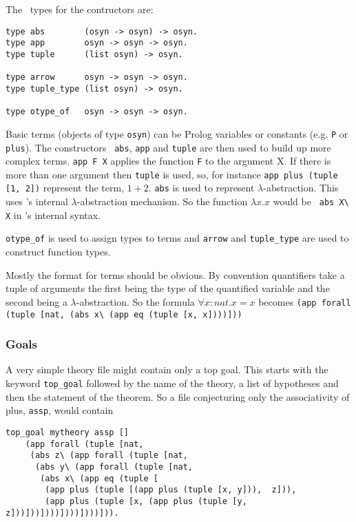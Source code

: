 The \lprolog\ types for the contructors are:
\begin{verbatim}
type abs        (osyn -> osyn) -> osyn.
type app        osyn -> osyn -> osyn.
type tuple      (list osyn) -> osyn.

type arrow      osyn -> osyn -> osyn.
type tuple_type (list osyn) -> osyn.

type otype_of   osyn -> osyn -> osyn.
\end{verbatim}
Basic
terms (objects of type {\tt osyn}) can be Prolog variables 
or constants (e.g. {\tt P} or {\tt plus}).  The constructors {\tt
  abs}, {\tt app} and {\tt tuple}
are then used to build up more complex terms.  {\tt app F X}
applies
the function {\tt F} to the argument {X}.  If there is more than one
argument then {\tt tuple} is used, so, for instance 
{\tt app plus (tuple [1, 2])} represent the term, $1 + 2$.  {\tt abs}
is used to represent
$\lambda$-abstraction.  This uses
\lprolog's internal $\lambda$-abstraction mechanism.  So the function
$\lambda x. x$ would be {\verb+ abs X\ X+} in \lclam's internal
syntax.

{\tt otype\_of} is used to assign types to terms and
{\tt arrow} and {\tt tuple\_type} are
used to construct function types.


Mostly the format for terms should be obvious.  By convention
quantifiers take a tuple of arguments the first
being the type of the 
quantified variable and the second being a $\lambda$-abstraction.  So
the formula $\forall x:nat.  x = x$ becomes \linebreak
\verb+(app forall (tuple [nat, (abs x\ (app eq (tuple [x, x])))]))+

\subsubsection{Goals}
A very simple theory file might contain only a top
goal.
This starts with the keyword {\tt top\_goal} followed
by the name of the theory, a list of hypotheses
and then the statement of the theorem.  So a file
conjecturing only the associativity of plus,
{\tt assp}, would contain

\begin{verbatim}
top_goal mytheory assp []
    (app forall (tuple [nat, 
     (abs z\ (app forall (tuple [nat, 
      (abs y\ (app forall (tuple [nat, 
       (abs x\ (app eq (tuple [
        (app plus (tuple [(app plus (tuple [x, y])),  z])), 
        (app plus (tuple [x, (app plus (tuple [y, z]))]))])))])))])))])).
\end{verbatim}

